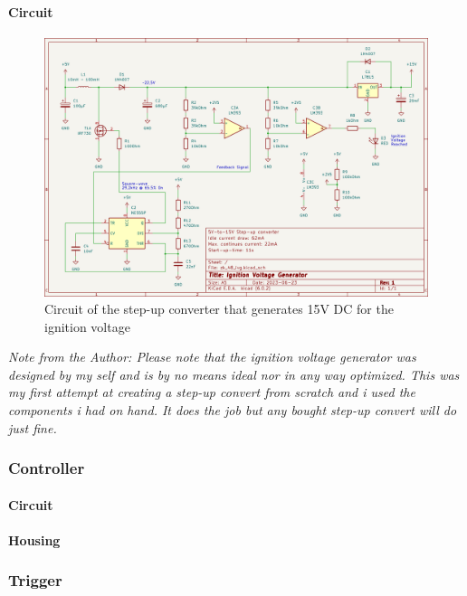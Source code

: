\paragraph{Circuit}

\begin{figure}[!ht]
    \centering
    \includegraphics[width=15cm]{./Figures/ivg_circuit.png}
    \caption{Circuit of the step-up converter that generates 15V DC for the ignition voltage}
    \label{fig:ivg_circuit}     
\end{figure}

\noindent \small{\textit{Note from the Author: Please note that the ignition voltage generator was designed by my self and is by no means ideal nor in any way optimized. This was my first attempt at creating a step-up convert from scratch and i used the components i had on hand. It does the job but any bought step-up convert will do just fine.}}\\


\subsubsection{Controller}
\label{Controller}
\paragraph{Circuit}
\paragraph{Housing}

\subsubsection{Trigger}
